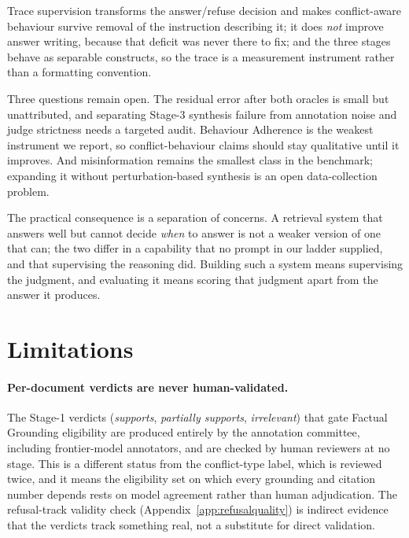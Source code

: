Trace supervision transforms the answer/refuse decision
and makes conflict-aware behaviour survive removal of the instruction describing
it; it does \emph{not} improve answer writing, because that deficit was never
there to fix; and the three stages behave as separable constructs, so the trace
is a measurement instrument rather than a formatting convention.

Three questions remain open. The residual error after both oracles is small but unattributed, and separating
Stage-3 synthesis failure from annotation noise and judge strictness needs a
targeted audit. Behaviour Adherence is the weakest instrument we report, so
conflict-behaviour claims should stay qualitative until it improves. And
misinformation remains the smallest class in the benchmark; expanding it without
perturbation-based synthesis is an open data-collection problem.

The practical consequence is a separation of concerns. A retrieval system that
answers well but cannot decide \emph{when} to answer is not a weaker version of
one that can; the two differ in a capability that no prompt in our ladder
supplied, and that supervising the reasoning did. Building such a system means
supervising the judgment, and evaluating it means scoring that judgment apart
from the answer it produces.

\section*{Limitations}
\label{sec:limitations}

\paragraph{Per-document verdicts are never human-validated.} The Stage-1
verdicts (\textit{supports}, \textit{partially supports}, \textit{irrelevant})
that gate Factual Grounding eligibility are produced entirely by the annotation
committee, including frontier-model annotators, and are checked by human
reviewers at no stage. This is a different status from the conflict-type label,
which is reviewed twice, and it means the eligibility set on which every
grounding and citation number depends rests on model agreement rather than
human adjudication. The refusal-track validity check
(Appendix~\ref{app:refusalquality}) is indirect evidence that the verdicts
track something real, not a substitute for direct validation.

